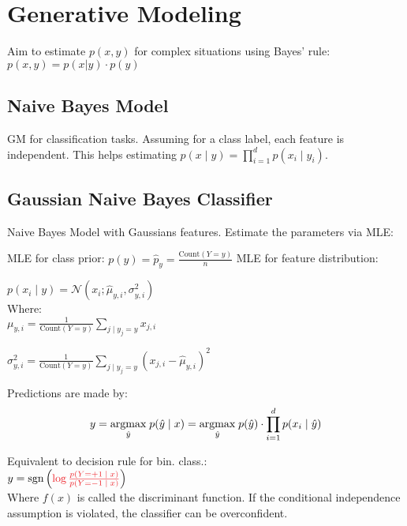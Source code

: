 \section*{Generative Modeling}

Aim to estimate $p(x, y)$ for complex situations using Bayes' rule: $p(x,y) = p(x|y) \cdot p(y)$

\subsection*{Naive Bayes Model}

GM for classification tasks. Assuming for a class label, each feature is independent. This helps estimating $p( x \; | \; y) =\prod_{i=1}^d p(x_i \; | \; y_i)$.

\subsection*{Gaussian Naive Bayes Classifier}

Naive Bayes Model with Gaussians features. Estimate the parameters via MLE:

MLE for class prior: $p(y) = \hat p_y = \frac{\text{Count}(Y = y)}{n}$
MLE for feature distribution:

\qquad \qquad $p(x_i \; | \; y) = \mathcal{N}(x_i; \hat \mu_{y,i}, \sigma^2_{y,i})$ \\[-13pt]

Where:\\[-10pt]

\qquad \quad $\mu_{y,i} = \frac{1}{\text{Count}(Y = y)} \sum_{j \; | \; y_j = y} x_{j,i}$

\qquad \quad $\sigma^2_{y,i} = \frac{1}{\text{Count}(Y = y)} \sum_{j \; | \; y_j = y} (x_{j,i} - \hat \mu_{y, i})^2$


Predictions are made by: \\[-20pt]
$$y = \underset{\hat y}{\text{argmax}} \; p(\hat y \; | \; x) = \underset{\hat y}{\text{argmax}} \; p(\hat y) \cdot \prod_{i=1}^d p(x_i \; | \; \hat y)$$

Equivalent to decision rule for bin. class.: \\[-8pt]

\qquad \qquad $y = \sgn \left( \color{Red} \log \frac{p(Y = +1 \; | \; x)}{p(Y = -1 \; | \; x)} \color{Black} \right)$ \\[-3pt]

Where \color{Red}$f(x)$\color{Black} is called the discriminant function. If the conditional independence assumption is violated, the classifier can be overconfident.

